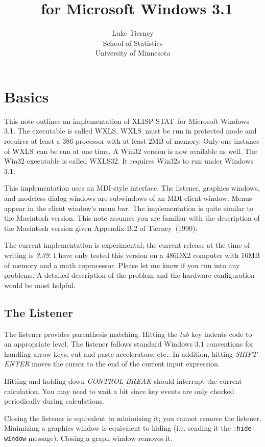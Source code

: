 \documentclass[11pt]{article}
\title{\XLS\ for Microsoft Windows 3.1}
\author{Luke Tierney\\School of Statistics\\University of Minnesota}
\newcommand{\dcode}[1]{{\tt #1}}
\newcommand{\XLS}{XLISP-STAT}
\newcommand{\WXLS}{WXLS}
\begin{document}
\maketitle
\tableofcontents
\section{Basics}
This note outlines an implementation of \XLS\ for Microsoft Windows
3.1. The executable is called \WXLS. \WXLS\ must be run in protected
mode and requires at least a 386 processor with at least 2MB of
memory. Only one instance of \WXLS\ can be run at one time. A Win32
version is now available as well. The Win32 executable is called
\WXLS32. It requires Win32s to run under Windows 3.1.

This implementation uses an MDI-style interface. The listener,
graphics windows, and modeless dialog windows are subwindows of an
MDI client window. Menus appear in the client window's menu bar. The
implementation is quite similar to the Macintosh version. This note
assumes you are familiar with the description of the Macintosh version
given Appendix B.2 of Tierney~(1990).

The current implementation is experimental; the current release at the
time of writing is {\em 3.39}.  I have only tested this version on a
486DX2 computer with 16MB of memory and a math coprocessor. Please let
me know if you run into any problems. A detailed description of the
problem and the hardware configuration would be most helpful.

\subsection{The Listener}
The listener provides parenthesis matching. Hitting the {\em tab}\/
key indents code to an appropriate level. The listener follows
standard Windows 3.1 conventions for handling arrow keys, cut and
paste accelerators, etc.. In addition, hitting {\em SHIFT-ENTER}\/
moves the cursor to the end of the current input expression.

Hitting and holding down {\em CONTROL-BREAK}\/ should interrupt the
current calculation. You may need to wait a bit since key events are
only checked periodically during calculations.

Closing the listener is equivalent to minimizing it; you cannot remove
the listener. Minimizing a graphics window is equivalent to hiding
(i.e.  sending it the \dcode{:hide-window} message). Closing a graph
window removes it.
\end{document}
